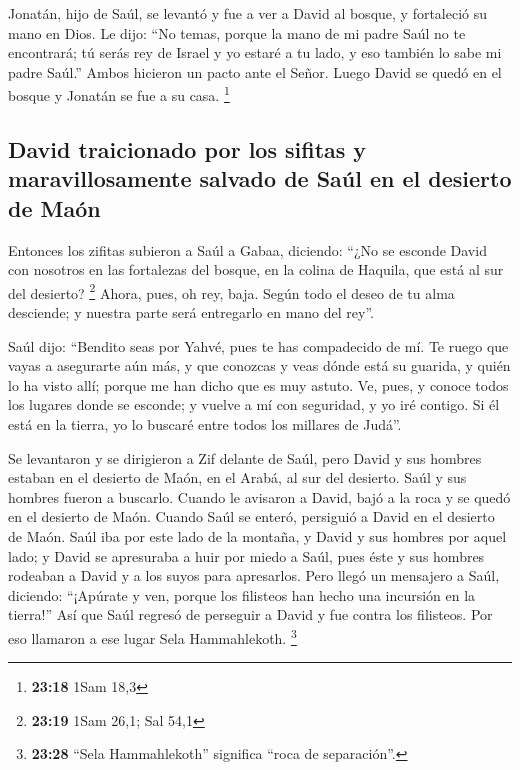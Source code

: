  Jonatán, hijo de Saúl, se levantó y fue a ver a David al
bosque, y fortaleció su mano en Dios.  Le dijo: ``No
temas, porque la mano de mi padre Saúl no te encontrará; tú serás rey de
Israel y yo estaré a tu lado, y eso también lo sabe mi padre Saúl.''
 Ambos hicieron un pacto ante el Señor. Luego David se
quedó en el bosque y Jonatán se fue a su casa. \footnote{\textbf{23:18}
  1Sam 18,3}

\hypertarget{david-traicionado-por-los-sifitas-y-maravillosamente-salvado-de-sauxfal-en-el-desierto-de-mauxf3n}{%
\subsection{David traicionado por los sifitas y maravillosamente salvado
de Saúl en el desierto de
Maón}\label{david-traicionado-por-los-sifitas-y-maravillosamente-salvado-de-sauxfal-en-el-desierto-de-mauxf3n}}

 Entonces los zifitas subieron a Saúl a Gabaa, diciendo:
``¿No se esconde David con nosotros en las fortalezas del bosque, en la
colina de Haquila, que está al sur del desierto? \footnote{\textbf{23:19}
  1Sam 26,1; Sal 54,1}  Ahora, pues, oh rey, baja. Según
todo el deseo de tu alma desciende; y nuestra parte será entregarlo en
mano del rey''.

 Saúl dijo: ``Bendito seas por Yahvé, pues te has
compadecido de mí.  Te ruego que vayas a asegurarte aún
más, y que conozcas y veas dónde está su guarida, y quién lo ha visto
allí; porque me han dicho que es muy astuto.  Ve, pues, y
conoce todos los lugares donde se esconde; y vuelve a mí con seguridad,
y yo iré contigo. Si él está en la tierra, yo lo buscaré entre todos los
millares de Judá''.

 Se levantaron y se dirigieron a Zif delante de Saúl,
pero David y sus hombres estaban en el desierto de Maón, en el Arabá, al
sur del desierto.  Saúl y sus hombres fueron a buscarlo.
Cuando le avisaron a David, bajó a la roca y se quedó en el desierto de
Maón. Cuando Saúl se enteró, persiguió a David en el desierto de Maón.
 Saúl iba por este lado de la montaña, y David y sus
hombres por aquel lado; y David se apresuraba a huir por miedo a Saúl,
pues éste y sus hombres rodeaban a David y a los suyos para apresarlos.
 Pero llegó un mensajero a Saúl, diciendo: ``¡Apúrate y
ven, porque los filisteos han hecho una incursión en la tierra!''
 Así que Saúl regresó de perseguir a David y fue contra
los filisteos. Por eso llamaron a ese lugar Sela Hammahlekoth.
\footnote{\textbf{23:28} ``Sela Hammahlekoth'' significa ``roca de
  separación''.}

